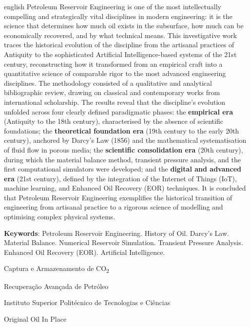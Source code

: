 \documentclass[12pt,a4paper,oneside,brazilian,sumario=tradicional]{abntex2}
\begin{document}
\begin{resumo}[Abstract]
\begin{otherlanguage*}{english}
Petroleum Reservoir Engineering is one of the most intellectually compelling and strategically vital disciplines in modern engineering: it is the science that determines how much oil exists in the subsurface, how much can be economically recovered, and by what technical means. This investigative work traces the historical evolution of the discipline from the artisanal practices of Antiquity to the sophisticated Artificial Intelligence-based systems of the 21st century, reconstructing how it transformed from an empirical craft into a quantitative science of comparable rigor to the most advanced engineering disciplines. The methodology consisted of a qualitative and analytical bibliographic review, drawing on classical and contemporary works from international scholarship. The results reveal that the discipline's evolution unfolded across four clearly defined paradigmatic phases: the \textbf{empirical era} (Antiquity to the 18th century), characterised by the absence of scientific foundations; the \textbf{theoretical foundation era} (19th century to the early 20th century), anchored by Darcy's Law (1856) and the mathematical systematisation of fluid flow in porous media; the \textbf{scientific consolidation era} (20th century), during which the material balance method, transient pressure analysis, and the first computational simulators were developed; and the \textbf{digital and advanced era} (21st century), defined by the integration of the Internet of Things (IoT), machine learning, and Enhanced Oil Recovery (EOR) techniques. It is concluded that Petroleum Reservoir Engineering exemplifies the historical transition of engineering from artisanal practice to a rigorous science of modelling and optimising complex physical systems.

\vspace{\onelineskip}
\noindent
\textbf{Keywords}: Petroleum Reservoir Engineering. History of Oil. Darcy's Law. Material Balance. Numerical Reservoir Simulation. Transient Pressure Analysis. Enhanced Oil Recovery (EOR). Artificial Intelligence.
\end{otherlanguage*}
\end{resumo}


\begin{siglas}
  \item[CCS] Captura e Armazenamento de CO\textsubscript{2}
  \item[EOR] Recuperação Avançada de Petróleo
  \item[ISPTEC] Instituto Superior Politécnico de Tecnologias e Ciências
  \item[OOIP] Original Oil In Place
\end{siglas}
\end{document}
